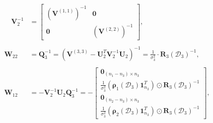 \documentclass[12pt]{article}
\newcommand{\bs}[1]{\boldsymbol{#1}}
\begin{document}
\begin{align*}
    \quad \bs{V}_2^{-1} &= \begin{bmatrix}
        (\bs{V}^{(1,1)})^{-1} & \bs{0}\\
        \bs{0} & (\bs{V}^{(2,2)})^{-1}
    \end{bmatrix},\\
    \\
    \bs{W}_{22} &= \bs{Q}_3^{-1} = (\bs{V}^{(3,3)} - \bs{U}_2^T\bs{V}_2^{-1}\bs{U}_2)^{-1} %
    = \frac{1}{\sigma_3^2}\cdot \bs{R}_3(\mathcal{D}_3)^{-1},\\
    \\
    \bs{W}_{12} &= -\bs{V}_2^{-1}\bs{U}_2\bs{Q}_3^{-1} =
    -\begin{bmatrix}
            \bs{0}_{(n_1-n_3)\times n_3}\\
            \frac{1}{\sigma_3^2}(\bs{\rho}_1(\mathcal{D}_3)\bs{1}_{n_3}^T)\odot \bs{R}_3(\mathcal{D}_3)^{-1}\\
            \bs{0}_{(n_2-n_3)\times n_3}\\
            \frac{1}{\sigma_3^2}(\bs{\rho}_2(\mathcal{D}_3)\bs{1}_{n_3}^T)\odot \bs{R}_3(\mathcal{D}_3)^{-1}
    \end{bmatrix},
\end{align*}
\end{document}

